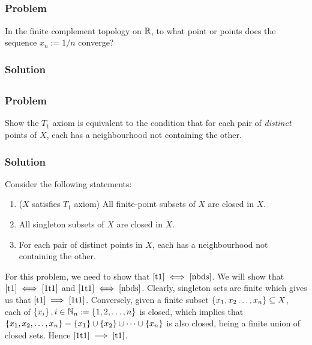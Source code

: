 
\setcounter{subsection}{13} %
\subsection{}

\subsubsection{Problem}
In the finite complement topology on $\mathbb R$, to what point or points does the sequence $x_n := 1/n$ converge?
\subsubsection{Solution}
\todo


\setcounter{subsection}{14} %
\subsection{}
\subsubsection{Problem}
Show the $T_1$ axiom is equivalent to the condition that for each pair of \emph{distinct} points of $X$, each has a neighbourhood not containing the other.

\subsubsection{Solution}
Consider the following  statements:
\begin{enumerate}
\item\label{t1} ($X$ satisfies $T_1$ axiom) All finite-point subsets of $X$ are closed in $X$.
\item\label{1t1} All singleton subsets of $X$ are closed in $X$.
\item\label{nbds} For each pair of distinct points in $X$, each has a neighbourhood not containing the other.
\end{enumerate}
For this problem, we need to show that $\ref{t1} \iff \ref{nbds}$. We will show that $\ref{t1} \iff \ref{1t1}$ and $\ref{1t1} \iff \ref{nbds}$.
Clearly, singleton sets are finite which gives us that $\ref{t1} \implies \ref{1t1}$. Conversely, given a finite subset $\left\{ x_1, x_2 \dots, x_n \right\} \subseteq X$, each of $\left\{ x_i \right\}, i \in \mathbb N_n := \left\{ 1, 2, \dots, n \right\}$ is closed, which implies that $\left\{ x_1, x_2, \dots, x_n \right\} = \left\{ x_1 \right\} \cup \left\{ x_2 \right\} \cup \dots \cup \left\{ x_n \right\}$ is also closed, being a finite union of closed sets. Hence $\ref{1t1} \implies \ref{t1}$.
\medskip

